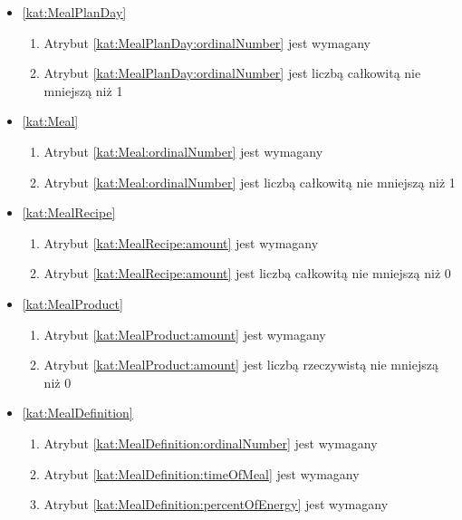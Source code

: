 \begin{itemize}[label={\textbf{Ograniczenia dla}}, wide, labelwidth=!, labelindent=0pt]
    \item\ref{kat:MealPlanDay}\mynobreakpar
    \begin{enumerate}[label={\textbf{OGR/3/\protect\twodigits{\arabic{enumi}}}}, wide, labelwidth=!, align=left, leftmargin=3cm, resume]
        \item Atrybut \ref{kat:MealPlanDay:ordinalNumber} jest wymagany

        \item Atrybut \ref{kat:MealPlanDay:ordinalNumber} jest liczbą całkowitą nie mniejszą niż 1
    \end{enumerate}

    \item\ref{kat:Meal}\mynobreakpar
    \begin{enumerate}[label={\textbf{OGR/3/\protect\twodigits{\arabic{enumi}}}}, wide, labelwidth=!, align=left, leftmargin=3cm, resume]
        \item Atrybut \ref{kat:Meal:ordinalNumber} jest wymagany

        \item Atrybut \ref{kat:Meal:ordinalNumber} jest liczbą całkowitą nie mniejszą niż 1
    \end{enumerate}

    \item\ref{kat:MealRecipe}\mynobreakpar
    \begin{enumerate}[label={\textbf{OGR/3/\protect\twodigits{\arabic{enumi}}}}, wide, labelwidth=!, align=left, leftmargin=3cm, resume]
        \item Atrybut \ref{kat:MealRecipe:amount} jest wymagany

        \item Atrybut \ref{kat:MealRecipe:amount} jest liczbą całkowitą nie mniejszą niż 0
    \end{enumerate}

    \item\ref{kat:MealProduct}\mynobreakpar
    \begin{enumerate}[label={\textbf{OGR/3/\protect\twodigits{\arabic{enumi}}}}, wide, labelwidth=!, align=left, leftmargin=3cm, resume]
        \item Atrybut \ref{kat:MealProduct:amount} jest wymagany

        \item Atrybut \ref{kat:MealProduct:amount} jest liczbą rzeczywistą nie mniejszą niż 0
    \end{enumerate}

    \item\ref{kat:MealDefinition}\mynobreakpar
    \begin{enumerate}[label={\textbf{OGR/3/\protect\twodigits{\arabic{enumi}}}}, wide, labelwidth=!, align=left, leftmargin=3cm, resume]
        \item Atrybut \ref{kat:MealDefinition:ordinalNumber} jest wymagany
        \item Atrybut \ref{kat:MealDefinition:timeOfMeal} jest wymagany
        \item Atrybut \ref{kat:MealDefinition:percentOfEnergy} jest wymagany


\end{enumerate}
\end{itemize}
